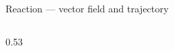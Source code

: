 \begin{frame}{Reaction --- vector field and trajectory}
\begin{columns}[c,onlytextwidth]
\begin{column}{0.53\textwidth}
    \end{column}

  \end{columns}

\end{frame}


